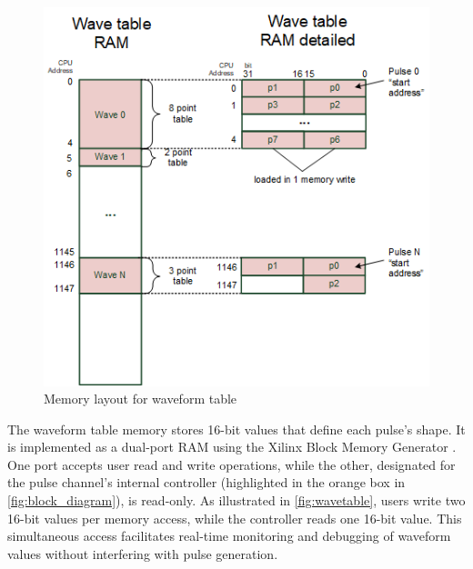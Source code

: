 \begin{figure}[htbp]
    \setlength{\abovecaptionskip}{5pt}    %
    \setlength{\belowcaptionskip}{5pt}    %
    \centering
    \includegraphics[width=0.55\linewidth]{figures/3.3.png}
    \caption{Memory layout for waveform table}
    \label{fig:wavetable}
\end{figure}

The waveform table memory stores 16-bit values that define each pulse's shape. It is implemented as a dual-port RAM using the Xilinx Block Memory Generator \cite{blockmemgen}. One port accepts user read and write operations, while the other, designated for the pulse channel's internal controller (highlighted in the orange box in \autoref{fig:block_diagram}), is read-only. As illustrated in \autoref{fig:wavetable}, users write two 16-bit values per memory access, while the controller reads one 16-bit value. This simultaneous access facilitates real-time monitoring and debugging of waveform values without interfering with pulse generation.



